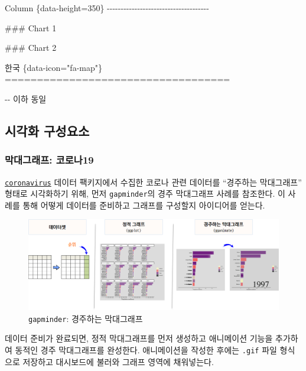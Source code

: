 \documentclass[
  letterpaper,
]{book}
\newenvironment{Shaded}{\begin{snugshade}}{\end{snugshade}}
\newcommand{\FunctionTok}[1]{\textcolor[rgb]{0.28,0.35,0.67}{#1}}
\newcommand{\NormalTok}[1]{\textcolor[rgb]{0.00,0.23,0.31}{#1}}
\begin{document}
\begin{Shaded}
\begin{Highlighting}[]
\NormalTok{Column \{data{-}height=350\}}
\NormalTok{{-}{-}{-}{-}{-}{-}{-}{-}{-}{-}{-}{-}{-}{-}{-}{-}{-}{-}{-}{-}{-}{-}{-}{-}{-}{-}{-}{-}{-}{-}{-}{-}{-}{-}{-}{-}{-}}

\FunctionTok{\#\#\# Chart 1}



\FunctionTok{\#\#\# Chart 2}


\NormalTok{한국 \{data{-}icon="fa{-}map"\}}
\FunctionTok{===================================}

\NormalTok{{-}{-} 이하 동일}
\end{Highlighting}
\end{Shaded}

\hypertarget{dashboard-graph}{%
\subsection{시각화 구성요소}\label{dashboard-graph}}

\hypertarget{corona-19}{%
\subsubsection{막대그래프: 코로나19}\label{corona-19}}

\href{https://ramikrispin.github.io/coronavirus/}{\texttt{coronavirus}}
데이터 팩키지에서 수집한 코로나 관련 데이터를 ``경주하는 막대그래프''
형태로 시각화하기 위해, 먼저 \texttt{gapminder}의 경주 막대그래프 사례를
참조한다. 이 사례를 통해 어떻게 데이터를 준비하고 그래프를 구성할지
아이디어를 얻는다. \autocite{reynolds2019racing}

\begin{figure}

{\centering \includegraphics{images/racing-barchart.png}

}

\caption{\texttt{gapminder}: 경주하는 막대그래프}

\end{figure}

데이터 준비가 완료되면, 정적 막대그래프를 먼저 생성하고 애니메이션
기능을 추가하여 동적인 경주 막대그래프를 완성한다. 애니메이션을 작성한
후에는 \texttt{.gif} 파일 형식으로 저장하고 대시보드에 불러와 그래프
영역에 채워넣는다.
\end{document}
